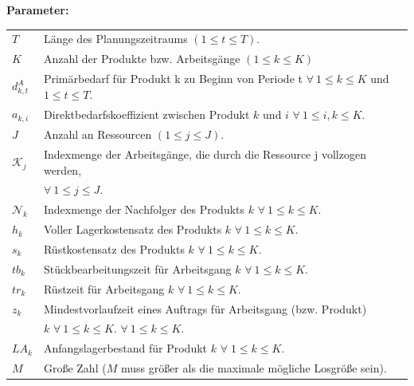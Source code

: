\textbf{Parameter:}
\begin{tabularx}{\linewidth}{@{}p{1cm}X} 	
    $T$ & Länge des Planungszeitraums $(1 \le t \le T)$. \\	
    $K$ & Anzahl der Produkte bzw. Arbeitsgänge $(1 \le k \le K)$ \\
    $d^{A}_{k,t}$ & Primärbedarf für Produkt k zu Beginn von Periode t $\forall~ 1 \le k \le K$ und $1 \le t \le T$.\\
    $a_{k,i}$ & Direktbedarfskoeffizient zwischen Produkt $k$ und $i$ $\forall~ 1 \le i, k \le K$. \\
    $J$ & Anzahl an Ressourcen $(1 \le j \le J)$. \\
    $\mathcal{K}_{j}$ & Indexmenge der Arbeitsgänge, die durch die Ressource j vollzogen werden, \\
    & $\forall ~1 \le j \le J$. \\
    $\mathcal{N}_{k}$ & Indexmenge der Nachfolger des Produkts $k$ $\forall ~ 1 \le k \le K$. \\
    $h_k$ & Voller Lagerkostensatz des Produkts $k$ $\forall~ 1 \le k \le K$. \\
    $s_k$ & Rüstkostensatz des Produkts $k$ $\forall~ 1 \le k \le K$. \\
    $tb_k$ & Stückbearbeitungszeit für Arbeitsgang $k$ $\forall~ 1 \le k \le K$. \\
    $tr_k$ & Rüstzeit für Arbeitsgang $k$ $\forall~ 1 \le k \le K$. \\
    $z_k$ & Mindestvorlaufzeit eines Auftrags für Arbeitsgang (bzw. Produkt) \\
    & $k$ $\forall~ 1 \le k \le K$. $\forall~ 1 \le k \le K$. \\
    $LA_{k}$ & Anfangslagerbestand für Produkt $k$ $\forall\; 1 \le k \le K$. \\	
    $M$ & Große Zahl ($M$ muss größer als die maximale mögliche Losgröße sein). \\
\end{tabularx}
\addtocounter{table}{-1} %

